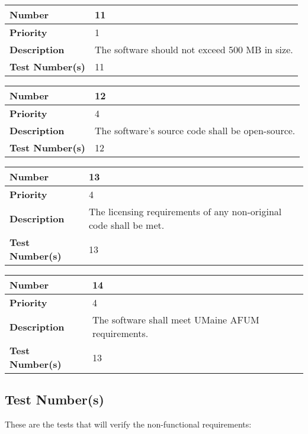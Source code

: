 \documentclass{article}
\begin{document}
\begin{center}
\bigskip
{}
\begin{tabular}{|p{3.5cm}|p{7.5cm}|} 
\hline
\textbf{Number} & 11  \\
\hline
\textbf{Priority} & 1 \\ 
\hline
\textbf{Description} & The software should not exceed 500 MB in size. \\ 
\hline
\textbf{Test Number(s) }& 11 \\ 
\hline
\end{tabular}


\bigskip
{}
\begin{tabular}{|p{3.5cm}|p{7.5cm}|} 
\hline
\textbf{Number} & 12  \\
\hline
\textbf{Priority} & 4\\ 
\hline
\textbf{Description} & The software's source code shall be open-source. \\ 
\hline
\textbf{Test Number(s) }& 12\\ 
\hline
\end{tabular}


\bigskip
{}
\begin{tabular}{|p{3.5cm}|p{7.5cm}|} 
\hline
\textbf{Number} & 13  \\
\hline
\textbf{Priority} & 4 \\ 
\hline
\textbf{Description} & The licensing requirements of any non-original code shall be met.\\ 
\hline
\textbf{Test Number(s) }& 13 \\ 
\hline
\end{tabular}

\bigskip
{}
\begin{tabular}{|p{3.5cm}|p{7.5cm}|} 
\hline
\textbf{Number} & 14  \\
\hline
\textbf{Priority} & 4 \\ 
\hline
\textbf{Description} & The software shall meet UMaine AFUM requirements.\\ 
\hline
\textbf{Test Number(s) }& 13 \\ 
\hline
\end{tabular}

\end{center}

\subsection{Test Number(s)}

These are the tests that will verify the non-functional requirements:
\end{document}
